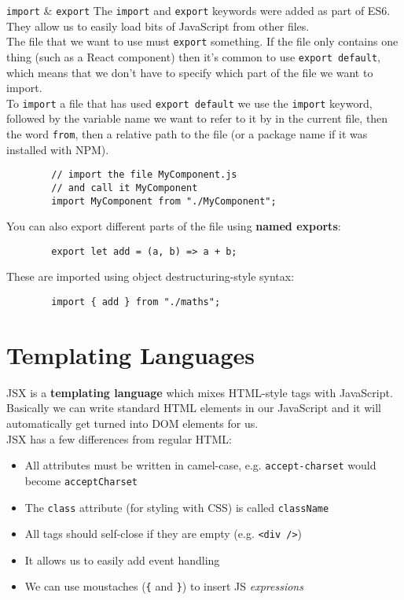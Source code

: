\begin{infobox}{\texttt{import} \& \texttt{export}}
    The \texttt{import} and \texttt{export} keywords were added as part of ES6. They allow us to easily load bits of JavaScript from other files.
    \\

    The file that we want to use must \texttt{export} something. If the file only contains one thing (such as a React component) then it's common to use \texttt{export default}, which means that we don't have to specify which part of the file we want to import.
    \\

    To \texttt{import} a file that has used \texttt{export default} we use the \texttt{import} keyword, followed by the variable name we want to refer to it by in the current file, then the word \texttt{from}, then a relative path to the file (or a package name if it was installed with NPM).

    \begin{verbatim}
        // import the file MyComponent.js
        // and call it MyComponent
        import MyComponent from "./MyComponent";
    \end{verbatim}

    You can also export different parts of the file using \textbf{named exports}:

    \begin{verbatim}
        export let add = (a, b) => a + b;
    \end{verbatim}

    These are imported using object destructuring-style syntax:

    \begin{verbatim}
        import { add } from "./maths";
    \end{verbatim}
\end{infobox}


\section{Templating Languages}

JSX is a \textbf{templating language} which mixes HTML-style tags with JavaScript. Basically we can write standard HTML elements in our JavaScript and it will automatically get turned into DOM elements for us.
\\

JSX has a few differences from regular HTML:

\begin{itemize}
    \item All attributes must be written in camel-case, e.g. \texttt{accept-charset} would become \texttt{acceptCharset}
    \item The \texttt{class} attribute (for styling with CSS) is called \texttt{className}
    \item All tags should self-close if they are empty (e.g. \texttt{<div />})
    \item It allows us to easily add event handling
    \item We can use moustaches (\texttt{\{} and \texttt{\}}) to insert JS \textit{expressions}
\end{itemize}

